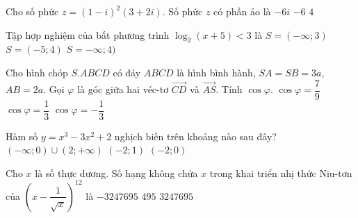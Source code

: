 \begin{ex}%
Cho số phức $z=(1-i)^2(3+2i)$. Số phức $z$ có phần ảo là
{$-6i$}
{\True $-6$}
{$4$}
\end{ex}

\begin{ex}%
Tập hợp nghiệm của bất phương trình $\log_2(x+5)<3$ là
{$S=(-\infty;3)$}
{$S=(-5;4)$}
{$S=-\infty;4)$}
\end{ex}

\begin{ex}%
Cho hình chóp $S.ABCD$ có đáy $ABCD$ là hình bình hành, $SA=SB=3a$, $AB=2a$. Gọi $\varphi$ là góc giữa hai véc-tơ $\overrightarrow{CD}$ và $\overrightarrow{AS}$. Tính $\cos\varphi$.
{$\cos\varphi=\dfrac{7}{9}$}
{$\cos\varphi=\dfrac{1}{3}$}
{\True $\cos\varphi=-\dfrac{1}{3}$}
\end{ex}

\begin{ex}%
Hàm số $y=x^3-3x^2+2$ nghịch biến trên khoảng nào sau đây?
{$(-\infty;0)\cup(2;+\infty)$}
{$(-2;1)$}
{$(-2;0)$}
\end{ex}

\begin{ex}%
Cho $x$ là số thực dương. Số hạng không chứa $x$ trong khai triển nhị thức Niu-tơn của $\left(x-\dfrac{1}{\sqrt{x}}\right)^{12}$ là
{$-3247695$}
{\True $495$}
{$3247695$}
\end{ex}

